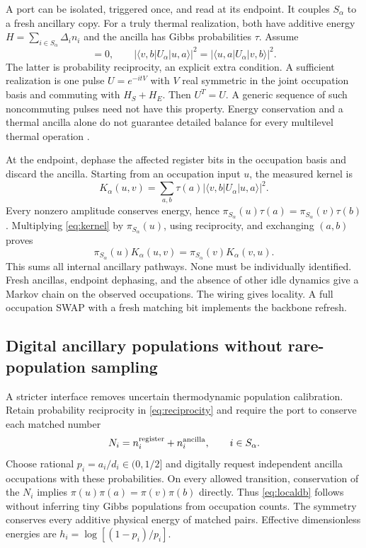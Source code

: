 \documentclass[10pt,a4paper]{article}
\theoremstyle{definition}\newtheorem{assumption}[theorem]{Assumption}
\begin{document}
A port can be isolated, triggered once, and read at its endpoint. It couples $S_\alpha$ to a fresh ancillary copy. For a truly thermal realization, both have additive energy $H=\sum_{i\in S_\alpha}\Delta_i n_i$ and the ancilla has Gibbs probabilities $\tau$. Assume
\begin{equation}
 [U_\alpha,H_S+H_E]=0,\qquad
 |\langle v,b|U_\alpha|u,a\rangle|^2
 =|\langle u,a|U_\alpha|v,b\rangle|^2.
 \label{eq:reciprocity}
\end{equation}
The latter is probability reciprocity, an explicit extra condition. A sufficient realization is one pulse $U=e^{-itV}$ with $V$ real symmetric in the joint occupation basis and commuting with $H_S+H_E$. Then $U^T=U$. A generic sequence of such noncommuting pulses need not have this property. Energy conservation and a thermal ancilla alone do not guarantee detailed balance for every multilevel thermal operation \cite{eto,collisions}.

At the endpoint, dephase the affected register bits in the occupation basis and discard the ancilla. Starting from an occupation input $u$, the measured kernel is
\begin{equation}
 K_\alpha(u,v)=\sum_{a,b}\tau(a)|\langle v,b|U_\alpha|u,a\rangle|^2.
 \label{eq:kernel}
\end{equation}
Every nonzero amplitude conserves energy, hence
$\pi_{S_\alpha}(u)\tau(a)=\pi_{S_\alpha}(v)\tau(b)$.
Multiplying \eqref{eq:kernel} by $\pi_{S_\alpha}(u)$, using reciprocity, and exchanging $(a,b)$ proves
\begin{equation}
 \pi_{S_\alpha}(u)K_\alpha(u,v)
 =\pi_{S_\alpha}(v)K_\alpha(v,u).
 \label{eq:localdb}
\end{equation}
This sums all internal ancillary pathways. None must be individually identified. Fresh ancillas, endpoint dephasing, and the absence of other idle dynamics give a Markov chain on the observed occupations. The wiring gives locality. A full occupation SWAP with a fresh matching bit implements the backbone refresh.

\subsection{Digital ancillary populations without rare-population sampling}

A stricter interface removes uncertain thermodynamic population calibration. Retain probability reciprocity in \eqref{eq:reciprocity} and require the port to conserve each matched number
\begin{equation}
 N_i=n_i^{\rm register}+n_i^{\rm ancilla},\qquad i\in S_\alpha.
 \label{eq:pairnumber}
\end{equation}
Choose rational $p_i=a_i/d_i\in(0,1/2]$ and digitally request independent ancilla occupations with these probabilities. On every allowed transition, conservation of the $N_i$ implies
$\pi(u)\pi(a)=\pi(v)\pi(b)$ directly. Thus \eqref{eq:localdb} follows without inferring tiny Gibbs populations from occupation counts. The symmetry conserves every additive physical energy of matched pairs. Effective dimensionless energies are $h_i=\log[(1-p_i)/p_i]$.
\end{document}
